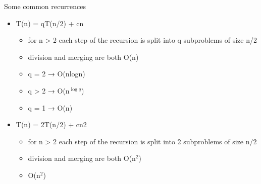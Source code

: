 Some common recurrences
\begin{itemize}
    \item T(n) = qT(n/2) + cn
    \begin{itemize}
        \item for n > 2
        each step of the recursion is split into q subproblems of size n/2
        \item division and merging are both O(n)
        \item q = 2 → O(nlogn)
        \item q > 2 → O(n$^{\log{q}}$)
        \item q = 1 → O(n)
        
    \end{itemize}
    \item T(n) = 2T(n/2) + cn2
    \begin{itemize}
        \item for n > 2
        each step of the recursion is split into 2 subproblems of size n/2
        \item division and merging are both O(n$^{2}$) 
        \item O(n$^{2}$)
    \end{itemize}

\end{itemize}

